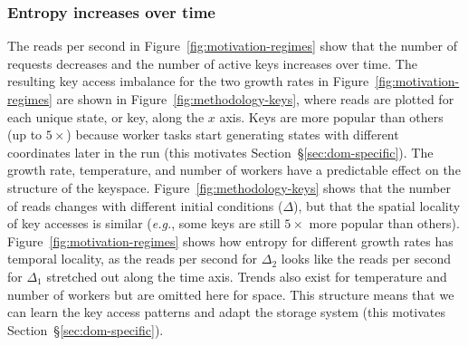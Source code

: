 \subsubsection*{Entropy increases over time} The reads per second in
Figure~\ref{fig:motivation-regimes} show that the number of requests decreases
and the number of active keys increases over time. The resulting key access
imbalance for the two growth rates in Figure~\ref{fig:motivation-regimes} are
shown in Figure~\ref{fig:methodology-keys}, where reads are plotted for each
unique state, or key, along the \(x\) axis. Keys are more popular than others
(up to \(5\times\)) because worker tasks start generating states with different
coordinates later in the run (this motivates Section~\S\ref{sec:dom-specific}).
The growth rate, temperature, and number of workers have a predictable effect
on the structure of the keyspace.  Figure~\ref{fig:methodology-keys} shows that
the number of reads changes with different initial conditions (\(\Delta\)), but
that the spatial locality of key accesses is similar ({\it e.g.}, some keys are
still \(5\times\) more popular than others).
Figure~\ref{fig:motivation-regimes} shows how entropy for different growth
rates has temporal locality, as the reads per second for \(\Delta_2\) looks
like the reads per second for \(\Delta_1\) stretched out along the time axis.
Trends also exist for temperature and number of workers but are omitted here
for space. This structure means that we can learn the key access patterns and adapt the
storage system (this motivates Section~\S\ref{sec:dom-specific}).
